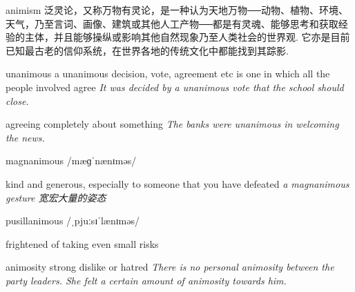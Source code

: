 \begin{DefWord}{animism}
    泛灵论，又称万物有灵论，是一种认为天地万物──动物、植物、环境、天气，乃至言词、画像、建筑或其他人工产物──都是有灵魂、能够思考和获取经验的主体，并且能够操纵或影响其他自然现象乃至人类社会的世界观. 它亦是目前已知最古老的信仰系统，在世界各地的传统文化中都能找到其踪影. 
\end{DefWord}

\begin{DefWord}{unanimous}
    a unanimous decision, vote, agreement etc is one in which all the people involved agree
    \textit{It was decided by a unanimous vote that the school should close.}

    agreeing completely about something
    \textit{The banks were unanimous in welcoming the news.}
\end{DefWord}

\begin{DefWord}{magnanimous}
    /mæɡˈnænɪməs/

    kind and generous, especially to someone that you have defeated
    \textit{a magnanimous gesture 宽宏大量的姿态}
\end{DefWord}

\begin{DefWord}{pusillanimous}
    /ˌpjuːsɪˈlænɪməs/
    
    frightened of taking even small risks
\end{DefWord}

\begin{DefWord}{animosity}
    strong dislike or hatred
    \textit{There is no personal animosity between the party leaders. She felt a certain amount of animosity towards him.}
\end{DefWord}
